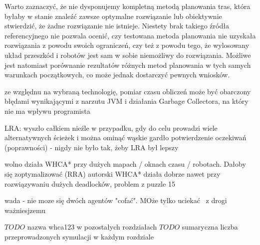 Warto zaznaczyć, że nie dysponujemy kompletną metodą planowania tras, która byłaby w stanie znaleźć zawsze optymalne rozwiązanie lub obiektywnie stwierdzić, że żadne rozwiązanie nie istnieje.
Niestety brak takiego źródła referencyjnego nie pozwala ocenić, czy testowana metoda planowania nie uzyskała rozwiązania z powodu swoich ograniczeń, czy też z powodu tego, że wylosowany układ przeszkód i robotów jest sam w sobie niemożliwy do rozwiązania.
Możliwe jest natomiast porównanie rezultatów różnych metod planowania w tych samych warunkach początkowych, co może jednak dostarczyć pewnych wniosków.

ze względnu na wybraną technologię, pomiar czasu obliczeń może być obarczony błędami wynikającymi z narzutu JVM i działania Garbage Collectora, na który nie ma wpływu programista

LRA: wyszło całkiem nieźle w przypadku, gdy do celu prowadzi wiele alternatywnych ścieżek i można ominąć wąskie gardło
potwierdzenie oczekiwań (poprawności) - nigdy nie było tak, żeby LRA był lepszy

wolno działa WHCA* przy dużych mapach / oknach czasu / robotach. Dałoby się zoptymalizować (RRA)
autorski WHCA* działa dobrze nawet przy rozwiązywaniu dużych deadlocków, problem z puzzle 15

wada - nie moze się dwóch agentów "cofać". MOże tylko uciekać  z drogi ważniesjzemu


$TODO$ nazwa whca123 w pozostałych rozdziałach
$TODO$ sumaryczna liczba przeprowadzonych symulacji w każdym rozdziale